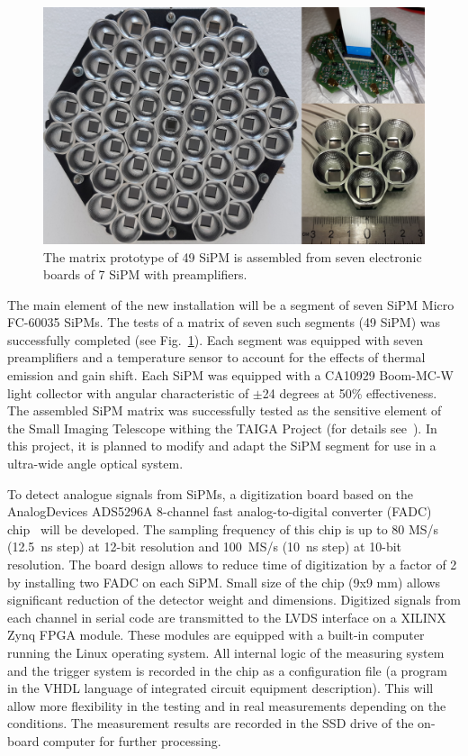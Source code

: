 \documentclass[a4paper,11pt]{article}
\begin{document}
\begin{figure}[t]
\centering %
\includegraphics[width=.55\textwidth]{mosaic_protype.png}
\caption{The matrix prototype of 49 SiPM is assembled from seven electronic boards of 7 SiPM with preamplifiers.}
\label{fig:mosaic49_7}
\end{figure}

The main element of the new installation will be a segment of seven SiPM Micro FC-60035 SiPMs. The tests of a matrix of seven such segments (49 SiPM) was successfully completed (see Fig.~\ref{fig:mosaic49_7}). Each segment was equipped with seven preamplifiers and a temperature sensor to account for the effects of thermal emission and gain shift. Each SiPM was equipped with a CA10929 Boom-MC-W light collector with angular characteristic of $\pm$24 degrees at 50\% effectiveness. The assembled SiPM matrix was successfully tested as the sensitive element of the Small Imaging Telescope withing the TAIGA Project (for details see~\cite{SIT20}). In this project, it is planned to modify and adapt the SiPM segment for use in a ultra-wide angle optical system.

To detect analogue signals from SiPMs, a digitization board based on the AnalogDevices ADS5296A 8-channel fast analog-to-digital converter (FADC) chip~\cite{FADC} will be developed. The sampling frequency of this chip is up to 80 MS/s (12.5~ns step) at 12-bit resolution and 100~MS/s (10~ns step) at 10-bit resolution.
The board design allows to reduce time of digitization by a factor of 2 by installing two FADC on each SiPM.
Small size of the chip (9x9 mm) allows significant reduction of the detector weight and dimensions. 
Digitized signals from each channel in serial code are transmitted to the LVDS interface on a XILINX Zynq FPGA module.
These modules are equipped with a built-in computer running the Linux operating system.
All internal logic of the measuring system and the trigger system is recorded in the chip as a configuration file (a program in the VHDL language of integrated circuit equipment description). This will allow more flexibility in the testing and in real measurements depending on the conditions.
The measurement results are recorded in the SSD drive of the on-board computer for further processing.
\end{document}
